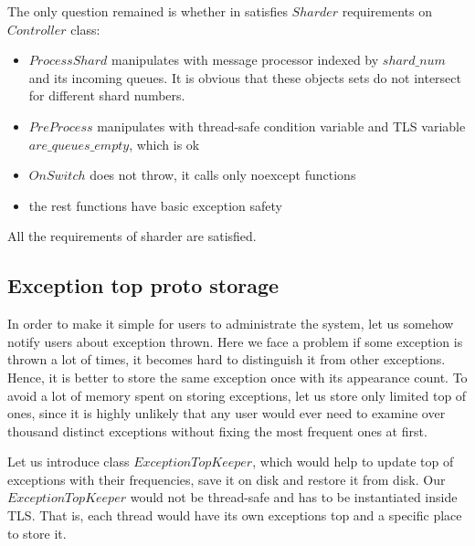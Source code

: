\documentclass{article}
\begin{document}
\begin{samepage}
	The only question remained is whether in satisfies $Sharder$ requirements on $Controller$ class:
	\begin{itemize}
		\item $ProcessShard$ manipulates with message processor indexed by $shard\_num$ and its incoming queues. It is obvious that these objects sets do not intersect for different shard numbers.
		\item $PreProcess$ manipulates with thread-safe condition variable and TLS variable\\
			$are\_queues\_empty$, which is ok
		\item $OnSwitch$ does not throw, it calls only noexcept functions
		\item the rest functions have basic exception safety
	\end{itemize}
\end{samepage}
All the requirements of sharder are satisfied.

\subsection{Exception top proto storage}
\label{subsec:exception_top_proto_storage}
In order to make it simple for users to administrate the system, let us somehow notify users about exception thrown. Here we face a problem if some exception is thrown a lot of times, it becomes hard to distinguish it from other exceptions. Hence, it is better to store the same exception once with its appearance count. To avoid a lot of memory spent on storing exceptions, let us store only limited top of ones, since it is highly unlikely that any user would ever need to examine over thousand distinct exceptions without fixing the most frequent ones at first.

Let us introduce class $ExceptionTopKeeper$, which would help to update top of exceptions with their frequencies, save it on disk and restore it from disk. Our $ExceptionTopKeeper$ would not be thread-safe and has to be instantiated inside TLS. That is, each thread would have its own exceptions top and a specific place to store it.
\end{document}
